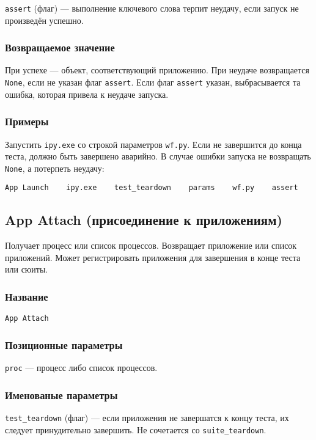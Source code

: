 \documentclass[11pt]{book} %
\begin{document}
\verb"assert" (флаг) --- выполнение ключевого слова терпит неудачу, если запуск не произведён успешно.

\subsubsection*{Возвращаемое значение} 
При успехе --- объект, соответствующий приложению. При неудаче возвращается \verb"None", если не указан флаг \verb"assert". Если флаг \verb"assert" указан, выбрасывается та ошибка, которая привела к неудаче запуска.

\subsubsection*{Примеры}
Запустить \verb"ipy.exe" со строкой параметров \verb"wf.py". Если не завершится до конца теста, должно быть завершено аварийно. В случае ошибки запуска не возвращать \verb"None", а потерпеть неудачу:

\begin{verbatim}App Launch    ipy.exe    test_teardown    params    wf.py    assert\end{verbatim}




\subsection{App Attach (присоединение к приложениям)}
Получает процесс или список процессов. Возвращает приложение или список приложений. Может регистрировать приложения для завершения в конце теста или сюиты.

\subsubsection*{Название} 
\verb"App Attach"

\subsubsection*{Позиционные параметры} 

\verb"proc" --- процесс либо список процессов.

\subsubsection*{Именованые параметры} 
\verb"test_teardown" (флаг) --- если приложения не завершатся к концу теста, их следует принудительно завершить. Не сочетается со \verb"suite_teardown".
\end{document}
